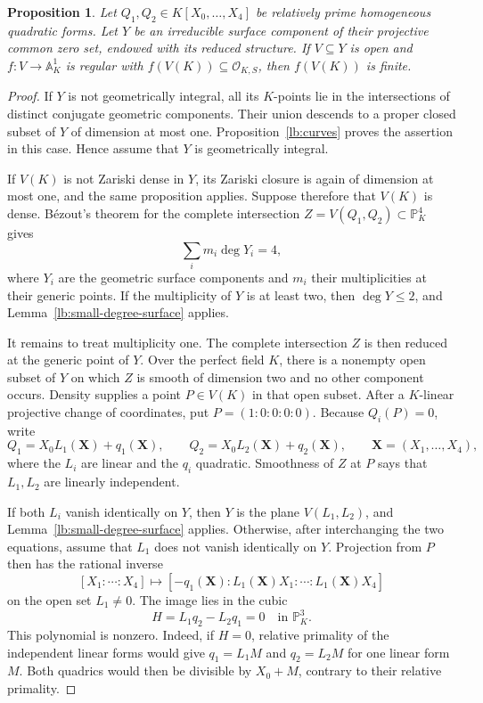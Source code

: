 \documentclass[11pt,a4paper]{article}
\newtheorem{proposition}[theorem]{Proposition}
\theoremstyle{definition}
\newcommand{\OKS}{\mathcal O_{K,S}}
\newcommand{\A}{\mathbb A}
\newcommand{\PP}{\mathbb P}
\begin{document}
\begin{proposition}\label{lb:two-quadrics}
Let $Q_1,Q_2\in K[X_0,\ldots,X_4]$ be relatively prime
homogeneous quadratic forms. Let $Y$ be an irreducible surface
component of their projective common zero set, endowed with its
reduced structure. If $V\subseteq Y$ is open and $f:V\to\A^1_K$
is regular with $f(V(K))\subseteq\OKS$, then $f(V(K))$ is finite.
\end{proposition}
\begin{proof}
If $Y$ is not geometrically integral, all its $K$-points lie in
the intersections of distinct conjugate geometric components.
Their union descends to a proper closed subset of $Y$ of dimension
at most one. Proposition~\ref{lb:curves} proves the assertion in
this case. Hence assume that $Y$ is geometrically integral.

If $V(K)$ is not Zariski dense in $Y$, its Zariski closure is
again of dimension at most one, and the same proposition applies.
Suppose therefore that $V(K)$ is dense. B\'ezout's theorem for the
complete intersection $Z=V(Q_1,Q_2)\subset\PP^4_K$ gives
\[
                    \sum_i m_i\deg Y_i=4,
\]
where $Y_i$ are the geometric surface components and $m_i$ their
multiplicities at their generic points. If the multiplicity of
$Y$ is at least two, then $\deg Y\le2$, and
Lemma~\ref{lb:small-degree-surface} applies.

It remains to treat multiplicity one. The complete intersection
$Z$ is then reduced at the generic point of $Y$. Over the perfect
field $K$, there is a nonempty open subset of $Y$ on which $Z$
is smooth of dimension two and no other component occurs. Density
supplies a point $P\in V(K)$ in that open subset. After a
$K$-linear projective change of coordinates, put
$P=(1:0:0:0:0)$. Because $Q_i(P)=0$, write
\[
 Q_1=X_0L_1(\mathbf X)+q_1(\mathbf X),\qquad
 Q_2=X_0L_2(\mathbf X)+q_2(\mathbf X),
 \qquad \mathbf X=(X_1,\ldots,X_4),
\]
where the $L_i$ are linear and the $q_i$ quadratic. Smoothness
of $Z$ at $P$ says that $L_1,L_2$ are linearly independent.

If both $L_i$ vanish identically on $Y$, then $Y$ is the plane
$V(L_1,L_2)$, and Lemma~\ref{lb:small-degree-surface} applies.
Otherwise, after interchanging the two equations, assume that
$L_1$ does not vanish identically on $Y$. Projection from $P$
then has the rational inverse
\[
 [X_1:\cdots:X_4]\longmapsto
 [-q_1(\mathbf X):L_1(\mathbf X)X_1:\cdots:
                               L_1(\mathbf X)X_4]
\]
on the open set $L_1\ne0$. The image lies in the cubic
\[
              H=L_1q_2-L_2q_1=0\quad\text{in }\PP^3_K.
\]
This polynomial is nonzero. Indeed, if $H=0$, relative
primality of the independent linear forms would give
$q_1=L_1M$ and $q_2=L_2M$ for one linear form $M$.
Both quadrics would then be divisible by $X_0+M$, contrary
to their relative primality.


\end{proof}
\end{document}
